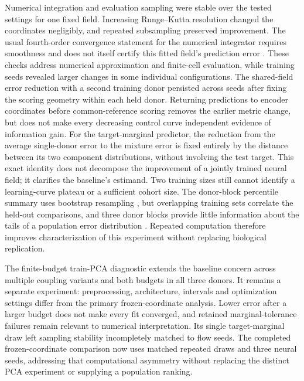 \documentclass[10pt,a4paper]{article}
\begin{document}
Numerical integration and evaluation sampling were stable over the tested settings for one fixed field. Increasing Runge--Kutta resolution changed the coordinates negligibly, and repeated subsampling preserved improvement. The usual fourth-order convergence statement for the numerical integrator requires smoothness and does not itself certify this fitted field's prediction error \citep{hairer1993}. These checks address numerical approximation and finite-cell evaluation, while training seeds revealed larger changes in some individual configurations. The shared-field error reduction with a second training donor persisted across seeds after fixing the scoring geometry within each held donor. Returning predictions to encoder coordinates before common-reference scoring removes the earlier metric change, but does not make every decreasing control curve independent evidence of information gain. For the target-marginal predictor, the reduction from the average single-donor error to the mixture error is fixed entirely by the distance between its two component distributions, without involving the test target. This exact identity does not decompose the improvement of a jointly trained neural field; it clarifies the baseline's estimand. Two training sizes still cannot identify a learning-curve plateau or a sufficient cohort size. The donor-block percentile summary uses bootstrap resampling \citep{efron1993bootstrap}, but overlapping training sets correlate the held-out comparisons, and three donor blocks provide little information about the tails of a population error distribution \citep{bengio2004,vabalas2019}. Repeated computation therefore improves characterization of this experiment without replacing biological replication.

The finite-budget train-PCA diagnostic extends the baseline concern across multiple coupling variants and both budgets in all three donors. It remains a separate experiment: preprocessing, architecture, intervals and optimization settings differ from the primary frozen-coordinate analysis. Lower error after a larger budget does not make every fit converged, and retained marginal-tolerance failures remain relevant to numerical interpretation. Its single target-marginal draw left sampling stability incompletely matched to flow seeds. The completed frozen-coordinate comparison now uses matched repeated draws and three neural seeds, addressing that computational asymmetry without replacing the distinct PCA experiment or supplying a population ranking.
\end{document}
